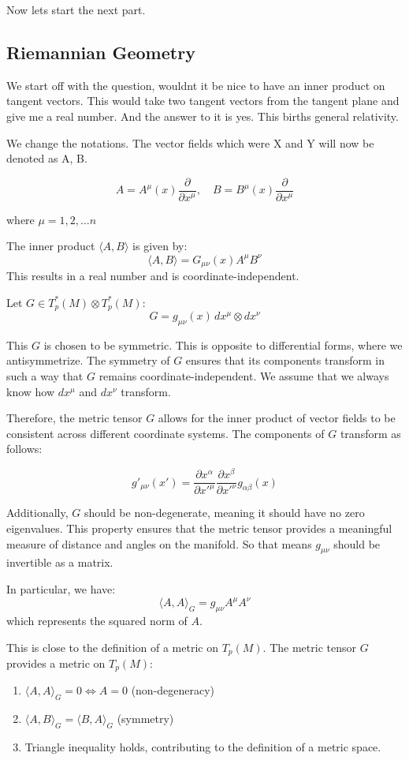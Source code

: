 \documentclass{article}
\begin{document}
Now lets start the next part.

\subsection{Riemannian Geometry}

We start off with the question, wouldnt it be nice to have an inner product on tangent  vectors. This would take two tangent vectors from the tangent plane and give me a real number. And the answer to it is yes. This births general relativity. 

We change the notations. The vector fields which were X and Y will now be denoted as A, B. 

\[
A = A^\mu(x) \frac{\partial}{\partial x^\mu}, \quad B = B^\mu(x) \frac{\partial}{\partial x^\mu}
\]

where \(\mu = 1,2,\dots n \)

The inner product \(\langle A, B \rangle\) is given by:
\[
\langle A, B \rangle = G_{\mu\nu}(x) A^\mu B^\nu
\]
This results in a real number and is coordinate-independent.

Let \( G \in T_p^*(M) \otimes T_p^*(M) \):
\[
G = g_{\mu\nu}(x) \, dx^\mu \otimes dx^\nu
\]

This \(G\) is chosen to be symmetric. This is opposite to differential forms, where we antisymmetrize. The symmetry of \(G\) ensures that its components transform in such a way that \(G\) remains coordinate-independent. We assume that we always know how \(dx^\mu\) and \(dx^\nu\) transform. 

Therefore, the metric tensor \(G\) allows for the inner product of vector fields to be consistent across different coordinate systems. The components of \(G\) transform as follows:

\[
g'_{\mu\nu}(x') = \frac{\partial x^\alpha}{\partial x'^\mu} \frac{\partial x^\beta}{\partial x'^\nu} g_{\alpha\beta}(x)
\]

Additionally, \(G\) should be non-degenerate, meaning it should have no zero eigenvalues. This property ensures that the metric tensor provides a meaningful measure of distance and angles on the manifold. So that means \( g_{ \mu \nu}\) should be invertible as a matrix. 

In particular, we have:
\[
\langle A, A \rangle_G = g_{\mu\nu} A^\mu A^\nu
\]
which represents the squared norm of \(A\). 

This is close to the definition of a metric on \( T_p(M) \). The metric tensor \( G \) provides a metric on \( T_p(M) \):
\begin{enumerate}
    \item \(\langle A, A \rangle_G = 0 \iff A = 0\) (non-degeneracy)
    \item \(\langle A, B \rangle_G = \langle B, A \rangle_G\) (symmetry)
    \item Triangle inequality holds, contributing to the definition of a metric space.
\end{enumerate}
\end{document}
